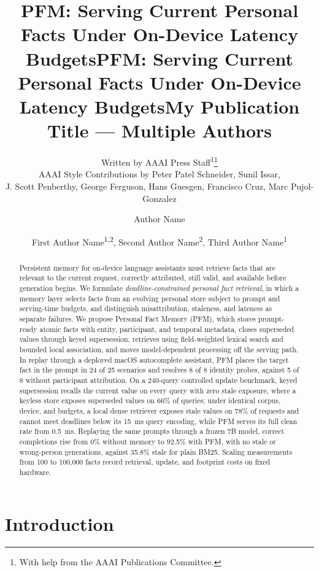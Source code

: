 \documentclass[letterpaper]{article} %
\title{PFM: Serving Current Personal Facts Under On-Device Latency Budgets}
\author{
    Written by AAAI Press Staff\textsuperscript{\rm 1}\thanks{With help from the AAAI Publications Committee.}\\
    AAAI Style Contributions by Peter Patel Schneider,
    Sunil Issar,\\
    J. Scott Penberthy,
    George Ferguson,
    Hans Guesgen,
    Francisco Cruz\equalcontrib\corresponding,
    Marc Pujol-Gonzalez\equalcontrib\corresponding
}
\title{PFM: Serving Current Personal Facts Under On-Device Latency Budgets}
\author {
    Author Name
}
\title{My Publication Title --- Multiple Authors}
\author {
    First Author Name\textsuperscript{\rm 1,\rm 2}\equalcontrib,
    Second Author Name\textsuperscript{\rm 2}\equalcontrib,
    Third Author Name\textsuperscript{\rm 1}\corresponding
}
\begin{document}
\maketitle

\begin{abstract}
Persistent memory for on-device language assistants must retrieve facts that are relevant to the current request, correctly attributed, still valid, and available before generation begins. We formulate \emph{deadline-constrained personal fact retrieval}, in which a memory layer selects facts from an evolving personal store subject to prompt and serving-time budgets, and distinguish misattribution, staleness, and lateness as separate failures. We propose Personal Fact Memory (PFM), which stores prompt-ready atomic facts with entity, participant, and temporal metadata, closes superseded values through keyed supersession, retrieves using field-weighted lexical search and bounded local association, and moves model-dependent processing off the serving path. In replay through a deployed macOS autocomplete assistant, PFM places the target fact in the prompt in 24 of 25 scenarios and resolves 8 of 8 identity probes, against 5 of 8 without participant attribution. On a 240-query controlled update benchmark, keyed supersession recalls the current value on every query with zero stale exposure, where a keyless store exposes superseded values on 66\% of queries; under identical corpus, device, and budgets, a local dense retriever exposes stale values on 78\% of requests and cannot meet deadlines below its 15~ms query encoding, while PFM serves its full clean rate from 0.5~ms. Replaying the same prompts through a frozen 7B model, correct completions rise from 0\% without memory to 92.5\% with PFM, with no stale or wrong-person generations, against 35.8\% stale for plain BM25. Scaling measurements from 100 to 100{,}000 facts record retrieval, update, and footprint costs on fixed hardware.
\end{abstract}


\section{Introduction}
\end{document}

